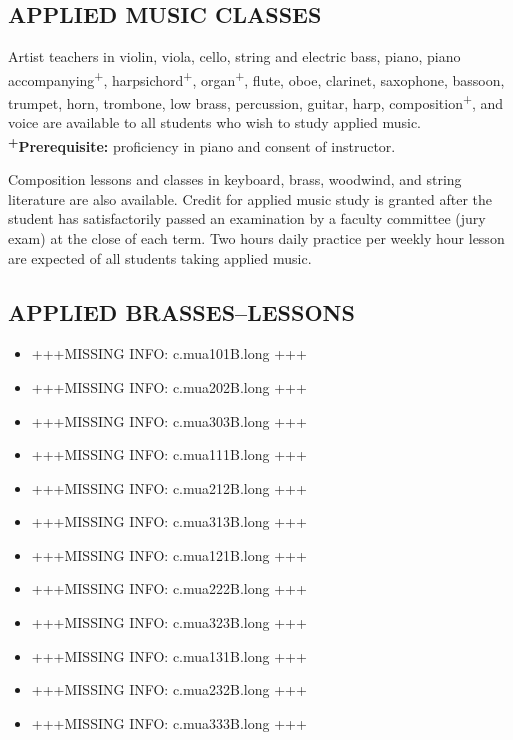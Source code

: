 \documentclass[
  letterpaper,
]{scrbook}
\providecommand{\tightlist}{%
  \setlength{\itemsep}{0pt}\setlength{\parskip}{0pt}}
\begin{document}
\subsection{APPLIED MUSIC CLASSES}\label{applied-music-classes}

Artist teachers in violin, viola, cello, string and electric bass,
piano, piano accompanying\textsuperscript{+},
harpsichord\textsuperscript{+}, organ\textsuperscript{+}, flute, oboe,
clarinet, saxophone, bassoon, trumpet, horn, trombone, low brass,
percussion, guitar, harp, composition\textsuperscript{+}, and voice are
available to all students who wish to study applied music.
\textbf{\textsuperscript{+}Prerequisite:} proficiency in piano and
consent of instructor.

Composition lessons and classes in keyboard, brass, woodwind, and string
literature are also available. Credit for applied music study is granted
after the student has satisfactorily passed an examination by a faculty
committee (jury exam) at the close of each term. Two hours daily
practice per weekly hour lesson are expected of all students taking
applied music.

\subsection{APPLIED BRASSES--LESSONS}\label{applied-brasseslessons}

\begin{itemize}
\tightlist
\item
  +++MISSING INFO: c.mua101B.long +++
\item
  +++MISSING INFO: c.mua202B.long +++
\item
  +++MISSING INFO: c.mua303B.long +++
\item
  +++MISSING INFO: c.mua111B.long +++
\item
  +++MISSING INFO: c.mua212B.long +++
\item
  +++MISSING INFO: c.mua313B.long +++
\item
  +++MISSING INFO: c.mua121B.long +++
\item
  +++MISSING INFO: c.mua222B.long +++
\item
  +++MISSING INFO: c.mua323B.long +++
\item
  +++MISSING INFO: c.mua131B.long +++
\item
  +++MISSING INFO: c.mua232B.long +++
\item
  +++MISSING INFO: c.mua333B.long +++
\end{itemize}
\end{document}
